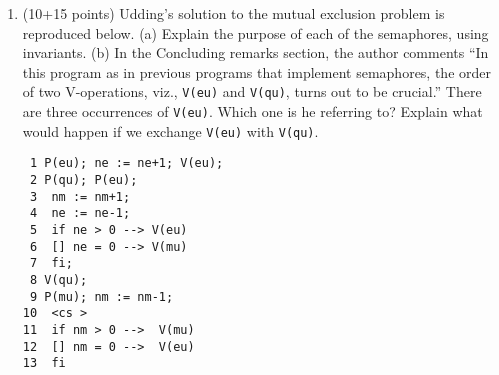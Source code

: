 \begin{enumerate}
\item (10+15 points)  Udding's solution to the mutual exclusion problem
is reproduced below.  (a) Explain the purpose of each of the
semaphores, using invariants. (b) In the Concluding remarks section,
the author comments ``In this program as in previous programs that
implement semaphores, the order of two V-operations, viz., {\tt V(eu)}
and {\tt V(qu)}, turns out to be crucial.''  There are three
occurrences of {\tt V(eu)}.  Which one is he referring to?  Explain
what would happen if we exchange {\tt V(eu)} with {\tt V(qu)}.

\begin{verbatim}
 1 P(eu); ne := ne+1; V(eu);
 2 P(qu); P(eu);	    
 3	nm := nm+1;	    
 4	ne := ne-1;	    
 5	if ne > 0 --> V(eu) 
 6	[] ne = 0 --> V(mu) 
 7	fi;		    
 8 V(qu);		    
 9 P(mu); nm := nm-1;	    
10	<cs >		    
11	if nm > 0 -->  V(mu)
12	[] nm = 0 -->  V(eu)
13	fi		    
\end{verbatim}

\end{enumerate}

